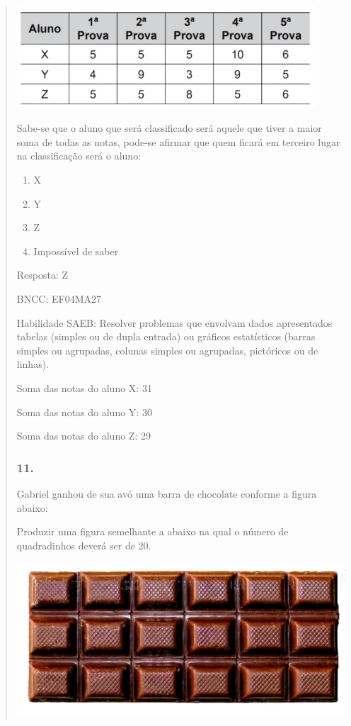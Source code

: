 \begin{enumerate}
\begin{escolha}
\begin{enumerate}
\begin{itemize}
\begin{itemize}
\begin{escolha}
\begin{quote}
\begin{escolha}
{\includegraphics[width=4.38462in,height=1.50708in]{media/image157.png}

Sabe-se que o aluno que será classificado será aquele que tiver a maior
soma de todas as notas, pode-se afirmar que quem ficará em terceiro
lugar na classificação será o aluno:

\begin{enumerate}
\def\labelenumi{\alph{enumi})}
\item
  X
\item
  Y
\item
  Z
\item
  Impossível de saber
\end{enumerate}

Resposta: Z

BNCC: EF04MA27

Habilidade SAEB: Resolver problemas que envolvam dados apresentados
tabelas (simples ou de dupla entrada) ou gráficos estatísticos (barras
simples ou agrupadas, colunas simples ou agrupadas, pictóricos ou de
linhas).

Soma das notas do aluno X: 31

Soma das notas do aluno Y: 30

Soma das notas do aluno Z: 29

\subsubsection{11.}\label{section-167}

Gabriel ganhou de sua avó uma barra de chocolate conforme a figura
abaixo:

Produzir uma figura semelhante a abaixo na qual o número de quadradinhos
deverá ser de 20.

\includegraphics[width=4.89209in,height=2.26686in]{media/image158.png}

}
\end{escolha}
\end{quote}
\end{escolha}
\end{itemize}
\end{itemize}
\end{enumerate}
\end{escolha}
\end{enumerate}

